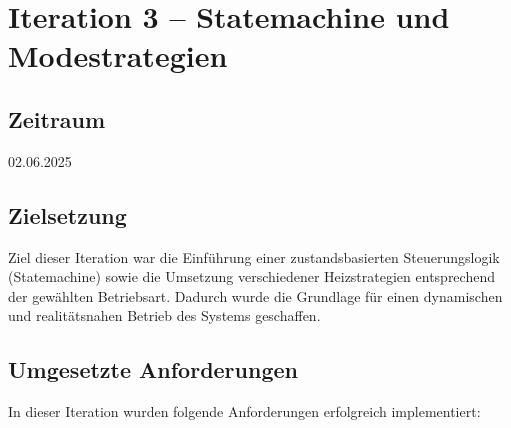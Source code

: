 \documentclass[a4paper,12pt]{article}
\begin{document}
\newpage

\section{Iteration 3 – Statemachine und Modestrategien}
\label{sec:iteration3}

\subsection{Zeitraum}
02.06.2025

\subsection{Zielsetzung}

Ziel dieser Iteration war die Einführung einer zustandsbasierten Steuerungslogik (Statemachine) sowie die Umsetzung verschiedener Heizstrategien entsprechend der gewählten Betriebsart. Dadurch wurde die Grundlage für einen dynamischen und realitätsnahen Betrieb des Systems geschaffen.

\subsection{Umgesetzte Anforderungen}

In dieser Iteration wurden folgende Anforderungen erfolgreich implementiert:
\end{document}
